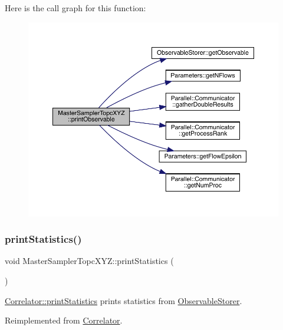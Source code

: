 Here is the call graph for this function\+:\nopagebreak
\begin{figure}[H]
\begin{center}
\leavevmode
\includegraphics[width=350pt]{class_master_sampler_topc_x_y_z_ab2312c9e9dc1e9deeb5bce36784372ac_cgraph}
\end{center}
\end{figure}
\mbox{\label{class_master_sampler_topc_x_y_z_a5a34a7f90ce8eea6c0efa06cfdfeb5f1}} 
\subsubsection{\texorpdfstring{printStatistics()}{printStatistics()}}
{\footnotesize\ttfamily void Master\+Sampler\+Topc\+X\+Y\+Z\+::print\+Statistics (\begin{DoxyParamCaption}{ }\end{DoxyParamCaption})\hspace{0.3cm}{\ttfamily [virtual]}}



\mbox{\hyperlink{class_correlator_a2168d677f547769784781d2e2aaa53cf}{Correlator\+::print\+Statistics}} prints statistics from \mbox{\hyperlink{class_observable_storer}{Observable\+Storer}}. 



Reimplemented from \mbox{\hyperlink{class_correlator_a2168d677f547769784781d2e2aaa53cf}{Correlator}}.

